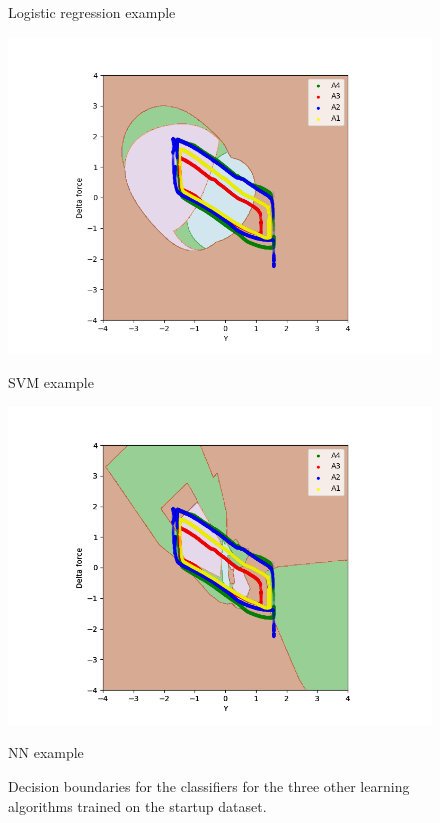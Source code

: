 \begin{figure}[]
\begin{minipage}[b]{0.48\linewidth}
                    \caption*{Logistic regression example}
                \end{minipage}
                \hfill
                \begin{minipage}[b]{0.48\linewidth}
                    \centering
                    \includegraphics[width = \textwidth]{figures/analysis/svm/SVM_noservo_010_001.png}
                    \caption*{SVM example}
                \end{minipage}
                \hfill
                \begin{minipage}[b]{0.48\linewidth}
                    \centering
                    \includegraphics[width = \textwidth]{figures/analysis/nn/neural_net_h5_d3_e1000_b40000_no_servo_servo.png}
                    \caption*{NN example}
                \end{minipage}
                \hfill
                \caption{Decision boundaries for the classifiers for the three other learning algorithms trained on the startup dataset.}
                \label{fig:startup_multiclass}
            \end{figure}
            
